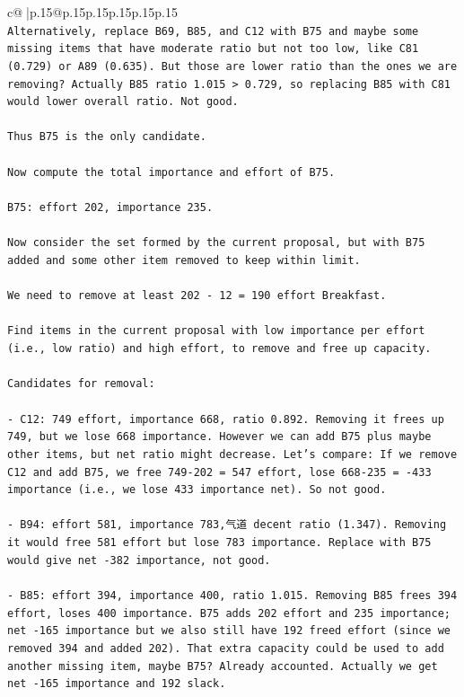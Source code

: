 \documentclass{article}
\begin{document}
{\begin{supertabular}{c@{$\;$}|p{.15\linewidth}@{}p{.15\linewidth}p{.15\linewidth}p{.15\linewidth}p{.15\linewidth}p{.15\linewidth}}
{{{\\ 
\texttt{Alternatively, replace B69, B85, and C12 with B75 and maybe some missing items that have moderate ratio but not too low, like C81 (0.729) or A89 (0.635). But those are lower ratio than the ones we are removing? Actually B85 ratio 1.015 > 0.729, so replacing B85 with C81 would lower overall ratio. Not good.} \\
\\ 
\texttt{Thus B75 is the only candidate.} \\
\\ 
\texttt{Now compute the total importance and effort of B75.} \\
\\ 
\texttt{B75: effort 202, importance 235.} \\
\\ 
\texttt{Now consider the set formed by the current proposal, but with B75 added and some other item removed to keep within limit.} \\
\\ 
\texttt{We need to remove at least 202 {-} 12 = 190 effort Breakfast.} \\
\\ 
\texttt{Find items in the current proposal with low importance per effort (i.e., low ratio) and high effort, to remove and free up capacity.} \\
\\ 
\texttt{Candidates for removal:} \\
\\ 
\texttt{{-} C12: 749 effort, importance 668, ratio 0.892. Removing it frees up 749, but we lose 668 importance. However we can add B75 plus maybe other items, but net ratio might decrease. Let's compare: If we remove C12 and add B75, we free 749{-}202 = 547 effort, lose 668{-}235 = {-}433 importance (i.e., we lose 433 importance net). So not good.} \\
\\ 
\texttt{{-} B94: effort 581, importance 783,气道 decent ratio (1.347). Removing it would free 581 effort but lose 783 importance. Replace with B75 would give net {-}382 importance, not good.} \\
\\ 
\texttt{{-} B85: effort 394, importance 400, ratio 1.015. Removing B85 frees 394 effort, loses 400 importance. B75 adds 202 effort and 235 importance; net {-}165 importance but we also still have 192 freed effort (since we removed 394 and added 202). That extra capacity could be used to add another missing item, maybe B75? Already accounted. Actually we get net {-}165 importance and 192 slack.} \\
}}}
\end{supertabular}}
\end{document}
